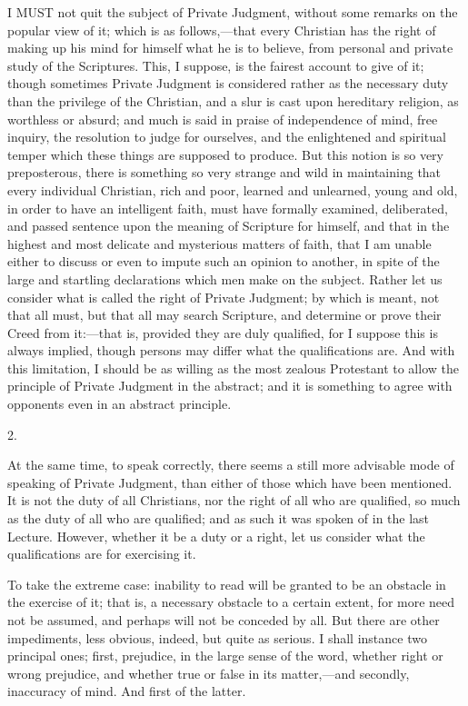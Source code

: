 
I MUST not quit the subject of Private Judgment, without some
remarks on the popular view of it; which is as follows,—that every
Christian has the right of making up his mind for himself what he is
to believe, from personal and private study of the Scriptures. This, I
suppose, is the fairest account to give of it; though sometimes
Private Judgment is considered rather as the necessary duty than the
privilege of the Christian, and a slur is cast upon hereditary
religion, as worthless or absurd; and much is said in praise of
independence of mind, free inquiry, the resolution to judge for
ourselves, and the enlightened and spiritual temper which these things
are supposed to produce. But this notion is so very preposterous,
there is something so very strange and wild in maintaining that every
individual Christian, rich and poor, learned and unlearned, young and
old, in order to have an intelligent faith, must have formally
examined, deliberated, and passed sentence upon the meaning of
Scripture for himself, and that in the highest and most delicate and
mysterious matters of faith, that I am unable either to discuss or
even to impute such an opinion to another, in spite of the large and
startling declarations which men make on the subject. Rather let us
consider what is called the right of Private Judgment; by which is
meant, not that all must, but that all may search Scripture, and
determine or prove their Creed from it:—that is, provided they are
duly qualified, for I suppose this is always implied, though persons
may differ what the qualifications are. And with this limitation, I
should be as willing as the most zealous Protestant to allow the
principle of Private Judgment in the abstract; and it is something to
agree with opponents even in an abstract principle.

2.

At the same time, to speak correctly, there seems a still more
advisable mode of speaking of Private Judgment, than either of those
which have been mentioned. It is not the duty of all Christians, nor
the right of all who are qualified, so much as the duty of all who are
qualified; and as such it was spoken of in the last Lecture. However,
whether it be a duty or a right, let us consider what the
qualifications are for exercising it.

To take the extreme case: inability to read will be granted to be
an obstacle in the exercise of it; that is, a necessary obstacle to a
certain extent, for more need not be assumed, and perhaps will not be
conceded by all. But there are other impediments, less obvious,
indeed, but quite as serious. I shall instance two principal ones;
first, prejudice, in the large sense of the word, whether right or
wrong prejudice, and whether true or false in its matter,—and
secondly, inaccuracy of mind. And first of the latter.

